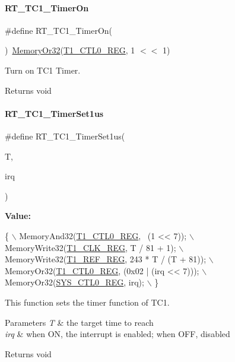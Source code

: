 \paragraph{\texorpdfstring{R\+T\+\_\+\+T\+C1\+\_\+\+Timer\+On}{RT\_TC1\_TimerOn}}
{\footnotesize\ttfamily \#define R\+T\+\_\+\+T\+C1\+\_\+\+Timer\+On(\begin{DoxyParamCaption}{ }\end{DoxyParamCaption})~\mbox{\hyperlink{a00026_a27874a97deab7cecdde5ddecf466e31e}{Memory\+Or32}}(\mbox{\hyperlink{a00026_a55600694c3c73a1019f78d306f474fa1}{T1\+\_\+\+C\+T\+L0\+\_\+\+R\+EG}}, 1 $<$$<$ 1)}



Turn on T\+C1 Timer. 

\begin{DoxyReturn}{Returns}
void 
\end{DoxyReturn}
\mbox{\label{a00080_a69c07e4e9fc56ae94d167f79399e7867}} 
\paragraph{\texorpdfstring{R\+T\+\_\+\+T\+C1\+\_\+\+Timer\+Set1us}{RT\_TC1\_TimerSet1us}}
{\footnotesize\ttfamily \#define R\+T\+\_\+\+T\+C1\+\_\+\+Timer\+Set1us(\begin{DoxyParamCaption}\item[{}]{T,  }\item[{}]{irq }\end{DoxyParamCaption})}

{\bfseries Value\+:}
\begin{DoxyCode}
\{                                                  \(\backslash\)
        MemoryAnd32(\mbox{\hyperlink{a00026_a55600694c3c73a1019f78d306f474fa1}{T1\_CTL0\_REG}}, ~(1 << 7));           \(\backslash\)
        MemoryWrite32(\mbox{\hyperlink{a00026_a319b804c31cf3d17dad1df712b0e1a95}{T1\_CLK\_REG}}, T / 81 + 1);             \(\backslash\)
        MemoryWrite32(\mbox{\hyperlink{a00026_ad17cf3aaa6ae5443a01b748050e708a1}{T1\_REF\_REG}}, 243 * T / (T + 81)); \(\backslash\)
        MemoryOr32(\mbox{\hyperlink{a00026_a55600694c3c73a1019f78d306f474fa1}{T1\_CTL0\_REG}}, (0x02 | (irq << 7)));  \(\backslash\)
        MemoryOr32(\mbox{\hyperlink{a00026_ab34acec79daf4fcc12a662cde9e75df7}{SYS\_CTL0\_REG}}, irq);                 \(\backslash\)
    \}
\end{DoxyCode}


This function sets the timer function of T\+C1. 


\begin{DoxyParams}{Parameters}
{\em T} & the target time to reach \\
\hline
{\em irq} & when ON, the interrupt is enabled; when O\+FF, disabled \\
\hline
\end{DoxyParams}
\begin{DoxyReturn}{Returns}
void 
\end{DoxyReturn}
